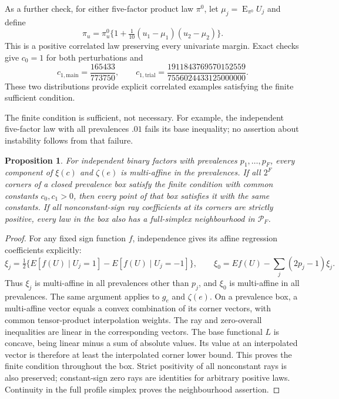 \documentclass[12pt,a4paper]{article}
\newtheorem{proposition}{Proposition}
\theoremstyle{definition}
\theoremstyle{remark}\newtheorem{remark}{Remark}
\numberwithin{equation}{section}
\newcommand{\E}{\operatorname{E}}
\begin{document}
As a further check, for either five-factor product law $\pi^0$, let $\mu_j=\E_{\pi^0}U_j$ and define
\[
 \pi_u=\pi^0_u\{1+\tfrac1{10}(u_1-\mu_1)(u_2-\mu_2)\}.
\]
This is a positive correlated law preserving every univariate margin. Exact checks give $c_0=1$ for both perturbations and
\[
 c_{1,\mathrm{main}}=\frac{165433}{773750},\qquad
 c_{1,\mathrm{trial}}=\frac{1911843769570152559}{7556024433125000000}.
\]
These two distributions provide explicit correlated examples satisfying the finite sufficient condition.

\noindent The finite condition is sufficient, not necessary. For example, the independent five-factor law with all prevalences $.01$ fails its base inequality; no assertion about instability follows from that failure.

\begin{proposition}\label{prop:alloc-box}
For independent binary factors with prevalences $p_1,\ldots,p_F$, every component of $\xi(c)$ and $\zeta(e)$ is multi-affine in the prevalences. If all $2^F$ corners of a closed prevalence box satisfy the finite condition with common constants $c_0,c_1>0$, then every point of that box satisfies it with the same constants. If all nonconstant-sign ray coefficients at its corners are strictly positive, every law in the box also has a full-simplex neighbourhood in $\mathcal P_F$.
\end{proposition}
\begin{proof}
For any fixed sign function $f$, independence gives its affine regression coefficients explicitly:
\[
 \xi_j=\tfrac12\{E[f(U)\mid U_j=1]-E[f(U)\mid U_j=-1]\},\qquad
 \xi_0=E f(U)-\sum_j(2p_j-1)\xi_j.
\]
Thus $\xi_j$ is multi-affine in all prevalences other than $p_j$, and $\xi_0$ is multi-affine in all prevalences. The same argument applies to $g_e$ and $\zeta(e)$. On a prevalence box, a multi-affine vector equals a convex combination of its corner vectors, with common tensor-product interpolation weights. The ray and zero-overall inequalities are linear in the corresponding vectors. The base functional $L$ is concave, being linear minus a sum of absolute values. Its value at an interpolated vector is therefore at least the interpolated corner lower bound. This proves the finite condition throughout the box. Strict positivity of all nonconstant rays is also preserved; constant-sign zero rays are identities for arbitrary positive laws. Continuity in the full profile simplex proves the neighbourhood assertion.
\end{proof}
\end{document}

